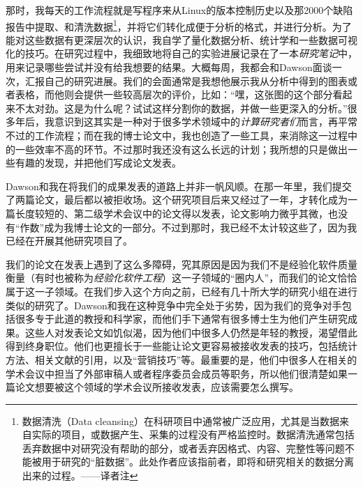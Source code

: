\documentclass[letter,12pt]{book}
\begin{document}
\begin{CJK}{UTF8}{gbsn}
那时，我每天的工作流程就是写程序来从Linux的版本控制历史以及那2000个缺陷报告中提取、和清洗数据\footnote{数据清洗（Data cleansing）在科研项目中通常被广泛应用，尤其是当数据来自实际的项目，或数据产生、采集的过程没有严格监控时。数据清洗通常包括丢弃数据中对研究没有帮助的部分，或者丢弃因格式、内容、完整性等问题不能被用于研究的“脏数据”。此处作者应该指前者，即将和研究相关的数据分离出来的过程。——译者注}，并将它们转化成便于分析的格式，并进行分析。为了能对这些数据有更深层次的认识，我自学了量化数据分析、统计学和一些数据可视化的技巧。在研究过程中，我细致地将自己的实验进展记录在了一本\emph{研究笔记}中，用来记录哪些尝试并没有给我想要的结果。大概每周，我都会和Dawson面谈一次，汇报自己的研究进展。我们的会面通常是我想他展示我从分析中得到的图表或者表格，而他则会提供一些较高层次的评价，比如：“嘿，这张图的这个部分看起来不太对劲。这是为什么呢？试试这样分割你的数据，并做一些更深入的分析。”很多年后，我意识到这其实是一种对于很多学术领域中的\emph{计算研究者们}而言，再平常不过的工作流程；而在我的博士论文中，我也创造了一些工具，来消除这一过程中的一些效率不高的环节。不过那时我还没有这么长远的计划；我所想的只是做出一些有趣的发现，并把他们写成论文发表。

\breakline

Dawson和我在将我们的成果发表的道路上并非一帆风顺。在那一年里，我们提交了两篇论文，最后都以被拒收场。这个研究项目后来又经过了一年，才转化成为一篇长度较短的、第二级学术会议中的论文得以发表，论文影响力微乎其微，也没有“作数”成为我博士论文的一部分。不过到那时，我已经不太计较这些了，因为我已经在开展其他研究项目了。

我们的论文在发表上遇到了这么多障碍，究其原因是因为我们不是经验化软件质量衡量（有时也被称为\emph{经验化软件工程}）这一子领域的“圈内人”，而我们的论文恰恰属于这一子领域。在我们步入这个方向之前，已经有几十所大学的研究小组在进行类似的研究了。Dawson和我在这种竞争中完全处于劣势，因为我们的竞争对手包括很多专于此道的教授和科学家，而他们手下通常有很多博士生为他们产生研究成果。这些人对发表论文如饥似渴，因为他们中很多人仍然是年轻的教授，渴望借此得到终身职位。他们也更擅长于一些能让论文更容易被接收发表的技巧，包括统计方法、相关文献的引用，以及“营销技巧”等。最重要的是，他们中很多人在相关的学术会议中担当了外部审稿人或者程序委员会成员等职务，所以他们很清楚如果一篇论文想要被这个领域的学术会议所接收发表，应该需要怎么撰写。


\end{CJK}
\end{document}
